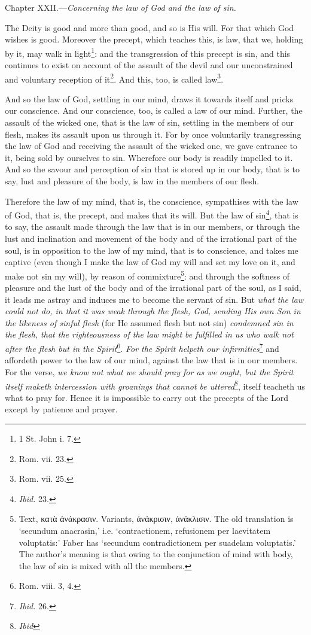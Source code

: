 
Chapter XXII.—\emph{Concerning the law of God and the law of sin.}

The Deity is good and more than good, and so is His will. For that which God wishes is good. Moreover the precept, which teaches this, is law, that we, holding by it, may walk in light\footnote{1 St. John i. 7.}: and the transgression of this precept is sin, and this continues to exist on account of the assault of the devil and our unconstrained and voluntary reception of it\footnote{Rom. vii. 23.}. And this, too, is called law\footnote{Rom. vii. 25.}.

And so the law of God, settling in our mind, draws it towards itself and pricks our conscience. And our conscience, too, is called a law of our mind. Further, the assault of the wicked one, that is the law of sin, settling in the members of our flesh, makes its assault upon us through it. For by once voluntarily transgressing the law of God and receiving the assault of the wicked one, we gave entrance to it, being sold by ourselves to sin. Wherefore our body is readily impelled to it. And so the savour and perception of sin that is stored up in our body, that is to say, lust and pleasure of the body, is law in the members of our flesh.

Therefore the law of my mind, that is, the conscience, sympathises with the law of God, that is, the precept, and makes that its will. But the law of sin\footnote{\emph{Ibid.} 23.}, that is to say, the assault made through the law that is in our members, or through the lust and inclination and movement of the body and of the irrational part of the soul, is in opposition to the law of my mind, that is to conscience, and takes me captive (even though I make the law of God my will and set my love on it, and make not sin my will), by reason of commixture\footnote{Text, \textgreek{κατὰ ἀνάκρασιν}. Variants, \textgreek{ἀνάκρισιν, ἀνάκλισιν}. The old translation is ‘secundum anacrasin,’ i.e. ‘contractionem, refusionem per laevitatem voluptatis:’ Faber has ‘secundum contradictionem per suadelam voluptatis.’ The author’s meaning is that owing to the conjunction of mind with body, the law of sin is mixed with all the members.}: and through the softness of pleasure and the lust of the body and of the irrational part of the soul, as I said, it leads me astray and induces me to become the servant of sin. But \emph{what the law could not do, in that it was weak through the flesh, God, sending His own Son in the likeness of sinful flesh }(for He assumed flesh but not sin) \emph{condemned sin in the flesh, that the righteousness of the law might be fulfilled in us who walk not after the flesh but in the Spirit}\footnote{Rom. viii. 3, 4.}.\emph{ For the Spirit helpeth our infirmities}\footnote{\emph{Ibid.} 26.} and affordeth power to the law of our mind, against the law that is in our members. For the verse, \emph{we know not what we should pray for as we ought, but the Spirit itself maketh intercession with groanings that cannot be uttered}\footnote{\emph{Ibid}}, itself teacheth us what to pray for. Hence it is impossible to carry out the precepts of the Lord except by patience and prayer.

